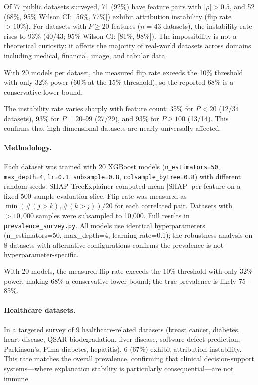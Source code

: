 \documentclass{article}
\begin{document}
Of 77 public datasets surveyed, 71 (92\%) have feature pairs with $|\rho| > 0.5$, and 52 (68\%, 95\% Wilson CI: [56\%, 77\%]) exhibit attribution instability (flip rate $> 10\%$). For datasets with $P \geq 20$ features ($n = 43$ datasets), the instability rate rises to 93\% (40/43; 95\% Wilson CI: [81\%, 98\%]). The impossibility is not a theoretical curiosity: it affects the majority of real-world datasets across domains including medical, financial, image, and tabular data.

With 20 models per dataset, the measured flip rate exceeds the 10\% threshold with only 32\% power (60\% at the 15\% threshold), so the reported 68\% is a conservative lower bound.

The instability rate varies sharply with feature count: 35\% for $P < 20$ (12/34 datasets), 93\% for $P = 20$--$99$ (27/29), and 93\% for $P \geq 100$ (13/14). This confirms that high-dimensional datasets are nearly universally affected.

\paragraph{Methodology.}
\begin{sloppypar}
Each dataset was trained with 20 XGBoost models (\texttt{n\_estimators=50},
\texttt{max\_depth=4}, \texttt{lr=0.1}, \texttt{subsample=0.8},
\texttt{colsample\_bytree=0.8}) with different random seeds. SHAP TreeExplainer
computed mean $|\text{SHAP}|$ per feature on a fixed 500-sample evaluation slice.
Flip rate was measured as $\min(\#(j{>}k), \#(k{>}j)) / 20$ for each correlated
pair. Datasets with $> 10{,}000$ samples were subsampled to 10{,}000. Full results
in \texttt{prevalence\_survey.py}.
All models use identical hyperparameters (n\_estimators=50, max\_depth=4, learning rate=0.1); the robustness analysis on 8 datasets with alternative configurations confirms the prevalence is not hyperparameter-specific.
\end{sloppypar}

With 20 models, the measured flip rate exceeds the 10\% threshold with only 32\% power, making 68\% a conservative lower bound; the true prevalence is likely 75--85\%.

\paragraph{Healthcare datasets.}
In a targeted survey of 9 healthcare-related datasets (breast cancer, diabetes, heart disease, QSAR biodegradation, liver disease, software defect prediction, Parkinson's, Pima diabetes, hepatitis), 6 (67\%) exhibit attribution instability. This rate matches the overall prevalence, confirming that clinical decision-support systems---where explanation stability is particularly consequential---are not immune.
\end{document}
